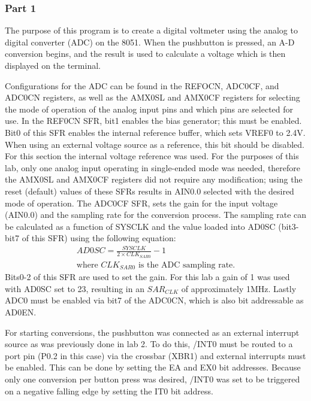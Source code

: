 \documentclass[12pt]{article}
\begin{document}
\subsubsection{Part 1}

The purpose of this program is to create a digital voltmeter using the analog to digital converter (ADC) on the 8051. When the pushbutton is pressed, an A-D conversion begins, and the result is used to calculate a voltage which is then displayed on the terminal. 

Configurations for the ADC can be found in the REFOCN, ADC0CF, and ADC0CN registers, as well as the AMX0SL and AMX0CF registers for selecting the mode of operation of the analog input pins and which pins are selected for use. In the REF0CN SFR, bit1 enables the bias generator; this must be enabled. Bit0 of this SFR enables the internal reference buffer, which sets VREF0 to 2.4V. When using an external voltage source as a reference, this bit should be disabled. For this section the internal voltage reference was used. For the purposes of this lab, only one analog input operating in single-ended mode was needed, therefore the AMX0SL and AMX0CF registers did not require any modification; using the reset (default) values of these SFRs results in AIN0.0 selected with the desired mode of operation. The ADC0CF SFR, sets the gain for the input voltage (AIN0.0) and the sampling rate for the conversion process. The sampling rate can be calculated as a function of SYSCLK and the value loaded into AD0SC (bit3-bit7 of this SFR) using the following equation:
\begin{align*}
AD0SC = \frac{SYSCLK}{2\times CLK_{SAR0}}-1\\
\text{where $CLK_{SAR0}$ is the ADC sampling rate.}
\end{align*}
\noindent
Bits0-2 of this SFR are used to set the gain. For this lab a gain of 1 was used with AD0SC set to 23, resulting in an $SAR_{CLK}$ of approximately \si{1}{MHz}. Lastly ADC0 must be enabled via bit7 of the ADC0CN, which is also bit addressable as AD0EN.

For starting conversions, the pushbutton was connected as an external interrupt source as was previously done in lab 2. To do this, /INT0 must be routed to a port pin (P0.2 in this case) via the crossbar (XBR1) and external interrupts must be enabled. This can be done by setting the EA and EX0 bit addresses. Because only one conversion per button press was desired, /INT0 was set to be triggered on a negative falling edge by setting the IT0 bit address.
\end{document}
